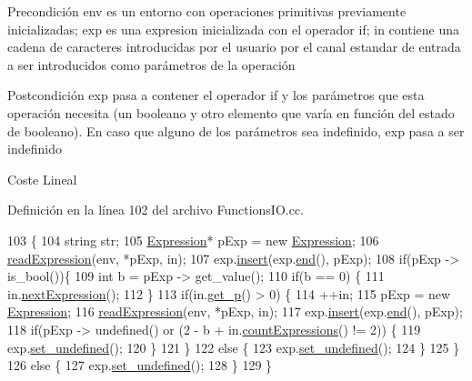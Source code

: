 \begin{DoxyPrecond}{Precondición}
\textquotesingle{}env\textquotesingle{} es un entorno con operaciones primitivas previamente inicializadas; \textquotesingle{}exp\textquotesingle{} es una expresion inicializada con el operador \textquotesingle{}if\textquotesingle{}; \textquotesingle{}in\textquotesingle{} contiene una cadena de caracteres introducidas por el usuario por el canal estandar de entrada a ser introducidos como parámetros de la operación 
\end{DoxyPrecond}
\begin{DoxyPostcond}{Postcondición}
\textquotesingle{}exp\textquotesingle{} pasa a contener el operador \textquotesingle{}if\textquotesingle{} y los parámetros que esta operación necesita (un booleano y otro elemento que varía en función del estado de booleano). En caso que alguno de los parámetros sea indefinido, \textquotesingle{}exp\textquotesingle{} pasa a ser indefinido 
\end{DoxyPostcond}
\begin{DoxyParagraph}{Coste}
Lineal 
\end{DoxyParagraph}


Definición en la línea 102 del archivo Functions\+I\+O.\+cc.


\begin{DoxyCode}
103 \{
104   \textcolor{keywordtype}{string} str;
105   \hyperlink{class_expression}{Expression}* pExp = \textcolor{keyword}{new} \hyperlink{class_expression}{Expression};
106   \hyperlink{_functions_i_o_8cc_a0c2a0ba0f4fe2dfe26ec14053ce4d408}{readExpression}(env, *pExp, in);
107   exp.\hyperlink{class_expression_a2f087974bb5cee7d0ea06838f5d68ba8}{insert}(exp.\hyperlink{class_expression_af5229aaf6bbb7200db55f220f315192e}{end}(), pExp);
108   \textcolor{keywordflow}{if}(pExp -> is\_bool())\{
109     \textcolor{keywordtype}{int} b = pExp -> get\_value();
110     \textcolor{keywordflow}{if}(b == 0) \{
111       in.\hyperlink{class_input_a1c8a389a2bccdcc8c6206c2fbdd6a9f8}{nextExpression}();
112     \}
113     \textcolor{keywordflow}{if}(in.\hyperlink{class_input_a61a5b6e5b3e5d7b3022cf93ee5320a1e}{get\_p}() > 0) \{
114       ++in;
115       pExp = \textcolor{keyword}{new} \hyperlink{class_expression}{Expression};
116       \hyperlink{_functions_i_o_8cc_a0c2a0ba0f4fe2dfe26ec14053ce4d408}{readExpression}(env, *pExp, in);
117       exp.\hyperlink{class_expression_a2f087974bb5cee7d0ea06838f5d68ba8}{insert}(exp.\hyperlink{class_expression_af5229aaf6bbb7200db55f220f315192e}{end}(), pExp);
118       \textcolor{keywordflow}{if}(pExp -> undefined() or  (2 - b + in.\hyperlink{class_input_ac9f1e2e25646ce602cf9ff83dcc563fe}{countExpressions}() != 2)) \{
119         exp.\hyperlink{class_expression_a1d3ddfe83d20f47930792807e8b22248}{set\_undefined}();
120       \}
121     \}
122     \textcolor{keywordflow}{else} \{
123       exp.\hyperlink{class_expression_a1d3ddfe83d20f47930792807e8b22248}{set\_undefined}();
124     \}
125   \}
126   \textcolor{keywordflow}{else} \{
127     exp.\hyperlink{class_expression_a1d3ddfe83d20f47930792807e8b22248}{set\_undefined}();
128   \}
129 \}
\end{DoxyCode}
